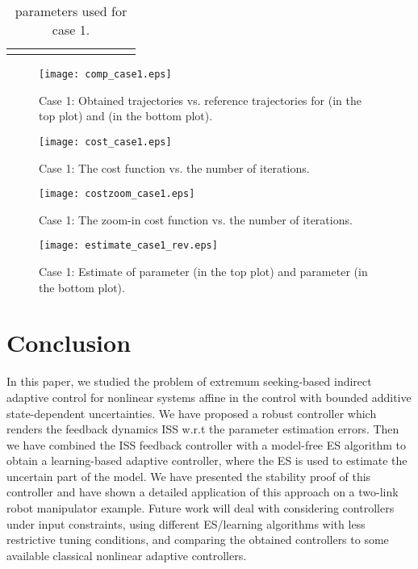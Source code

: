 \documentclass[twoside,leqno,onecolumn]{article}
\begin{document}
\begin{table}
\caption{parameters used for case 1.} \label{tab:varying1}
\centering
\begin{tabular}{ |c|c|c|c|c|c|c|c|c|c| }
 \hline
 &  &  & &  &&
 & & \\ [0.5em] \hline
 &  &  &  &  &  &   &  & \\
 \hline
\end{tabular}
\end{table}







\begin{figure}[!t]
 \centering
 \texttt{[image: comp\_case1.eps]}
 \caption{Case 1: Obtained trajectories vs. reference trajectories for  (in the top plot) and  (in the bottom plot).}
 \label{fig:comp_case1}
\end{figure}

\begin{figure}[!t]
 \centering
 \texttt{[image: cost\_case1.eps]}
 \caption{Case 1: The cost function vs. the number of iterations.}
 \label{fig:cost_case1}
\end{figure}

\begin{figure}[!t]
 \centering
 \texttt{[image: costzoom\_case1.eps]}
 \caption{Case 1: The zoom-in cost function vs. the number of iterations.}
 \label{fig:costzoom_case1}
\end{figure}

\begin{figure}[!t]
 \centering
 \texttt{[image: estimate\_case1\_rev.eps]}
 \caption{Case 1: Estimate of parameter  (in the top plot) and parameter  (in the bottom plot).}
 \label{fig:estimate_case1}
\end{figure}

\section{Conclusion}
\label{sec:con} In this paper, we studied the problem of extremum
seeking-based indirect adaptive control for nonlinear systems
affine in the control with bounded additive state-dependent
uncertainties. We have proposed a robust controller which renders
the feedback dynamics ISS w.r.t the parameter estimation errors.
Then we have combined the ISS feedback controller with a
model-free ES algorithm to obtain a learning-based adaptive
controller, where the ES is used to estimate the uncertain part of
the model. We have presented the stability proof of this
controller and have shown a detailed application of this approach
on a two-link robot manipulator example. Future work will deal
with considering controllers under input constraints, using
different ES/learning algorithms with less restrictive tuning
conditions, and comparing the obtained controllers to some
available classical nonlinear adaptive controllers.




\end{document}
